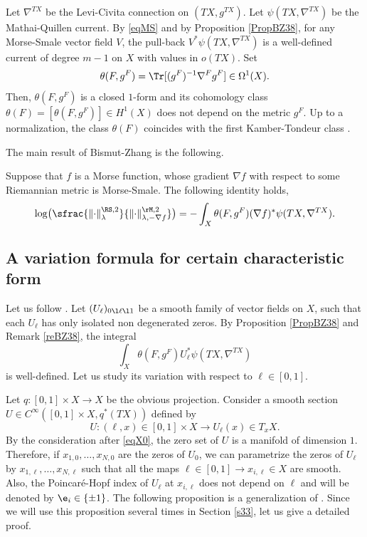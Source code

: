 Let $\nabla^{TX}$ be the Levi-Civita connection on $(TX,g^{TX})$. Let
$\psi(TX,\nabla^{TX})$ be the Mathai-Quillen current. By \eqref{eqMS} and by Proposition \ref{PropBZ38}, for any Morse-Smale vector field
$V$, the pull-back $V^{*}\psi(TX,\nabla^{TX})$ is a well-defined current of degree $m-1$ on $X$ with values in $o(TX)$.
Set
\begin{equation*}
\theta(F,g^{F})=\Tr[(g^{F})^{-1}\nabla^{F}g^{F}]\in
\Omega^{1}(X).
\end{equation*}
Then, $\theta(F,g^{F})$ is a closed $1$-form and its cohomology class
$\theta(F)=[\theta(F,g^{F})]\in H^{1}(X)$ does not depend on the
metric $g^F$. Up to a normalization, the class $\theta(F)$ coincides with the first Kamber-Tondeur class \cite{KamberTondeur74}.

\pagebreak[2]
The main result of Bismut-Zhang \cite[Th.\,0.2]{BZ92} is the following.

\begin{thm}\label{BZ}
Suppose that $f$ is a Morse function, whose gradient $\nabla f$ with respect to
some Riemannian metric is Morse-Smale. The following identity holds,
\begin{equation*}\label{eqBZ}
\log\bigl(\sfrac{\|{\cdot}\|^{\RS,2}_{\lambda}}{\|{\cdot}\|^{\rM,2}_{\lambda,-\nabla f}}\bigr)=-\int_{X}\theta(F,g^{F})(\nabla f)^{*}\psi(TX, \nabla ^{TX}).
\end{equation*}
\end{thm}

\subsection{A variation formula for certain characteristic
form}\label{sMa}Let us follow \cite[\S VI.a) and VI.b)]{BZ92}.
Let $(U_{\ell})_{0\l \ell\l 1}$ be a smooth family of vector fields
on $X$, such that each $U_{\ell}$ has only isolated non degenerated
zeros. By Proposition \ref{PropBZ38} and Remark \ref{reBZ38}, the integral
\begin{equation*}
\int_{X}\theta(F,g^{F})U_{\ell}^{*}\psi(TX, \nabla ^{TX})
\end{equation*}
is well-defined. Let us study its variation with respect to $\ell\in [0,1]$.

Let $q: [0,1]\times X\to X$ be the obvious projection. Consider a
smooth section $U\in C^{\infty}([0,1]\times X, q^{*}(TX))$ defined by
\begin{equation*}
U: (\ell,x)\in [0,1]\times X\to U_{\ell}(x)\in T_{x}X.
\end{equation*}
By the consideration after \eqref{eqX0}, the zero set of $U$ is a
manifold of dimension $1$.
Therefore, if $x_{1,0}, \ldots, x_{N,0}$ are the zeros of $U_{0}$,
we can parametrize the zeros of $U_{\ell}$ by
$x_{1,\ell},\ldots,x_{N,\ell}$ such that all the maps $\ell\in
[0,1]\to x_{i,\ell}\in X$ are
smooth. Also, the Poincaré-Hopf index of $U_{\ell}$ at
$x_{i,\ell}$ does not depend on $\ell$ and will be denoted by
$\e_{i}\in \{\pm1\}$. The following proposition is a generalization of \cite[Prop.\,6.4]{BZ92}. Since we will use this proposition several times in
Section \ref{s33}, let us give a detailed proof.

